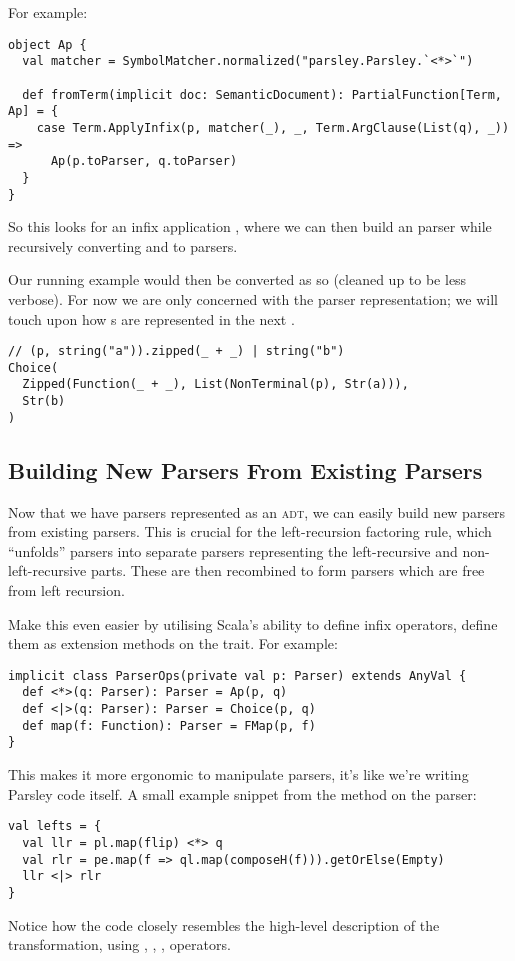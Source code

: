 \documentclass[../../main.tex]{subfiles}
\begin{document}
For example:
\begin{verbatim}
object Ap {
  val matcher = SymbolMatcher.normalized("parsley.Parsley.`<*>`")

  def fromTerm(implicit doc: SemanticDocument): PartialFunction[Term, Ap] = {
    case Term.ApplyInfix(p, matcher(_), _, Term.ArgClause(List(q), _)) =>
      Ap(p.toParser, q.toParser)
  }
}
\end{verbatim}
So this looks for an infix application , where we can then build an  parser while recursively converting  and  to parsers.

Our running example would then be converted as so (cleaned up to be less verbose).
For now we are only concerned with the parser representation; we will touch upon how s are represented in the next .
\begin{verbatim}
// (p, string("a")).zipped(_ + _) | string("b")
Choice(
  Zipped(Function(_ + _), List(NonTerminal(p), Str(a))),
  Str(b)
)
\end{verbatim}

\subsection{Building New Parsers From Existing Parsers}
Now that we have parsers represented as an \textsc{adt}, we can easily build new parsers from existing parsers.
This is crucial for the left-recursion factoring rule, which ``unfolds'' parsers into separate parsers representing the left-recursive and non-left-recursive parts.
These are then recombined to form parsers which are free from left recursion.

Make this even easier by utilising Scala's ability to define infix operators, define them as extension methods on the  trait.
For example:
\begin{verbatim}
implicit class ParserOps(private val p: Parser) extends AnyVal {
  def <*>(q: Parser): Parser = Ap(p, q)
  def <|>(q: Parser): Parser = Choice(p, q)
  def map(f: Function): Parser = FMap(p, f)
}
\end{verbatim}
%
This makes it more ergonomic to manipulate parsers, it's like we're writing Parsley code itself.
A small example snippet from the  method on the  parser:
\begin{verbatim}
val lefts = {
  val llr = pl.map(flip) <*> q
  val rlr = pe.map(f => ql.map(composeH(f))).getOrElse(Empty)
  llr <|> rlr
}
\end{verbatim}
Notice how the code closely resembles the high-level description of the transformation, using \scala{<*>}, \scala{<|>}, , operators.
\end{document}

